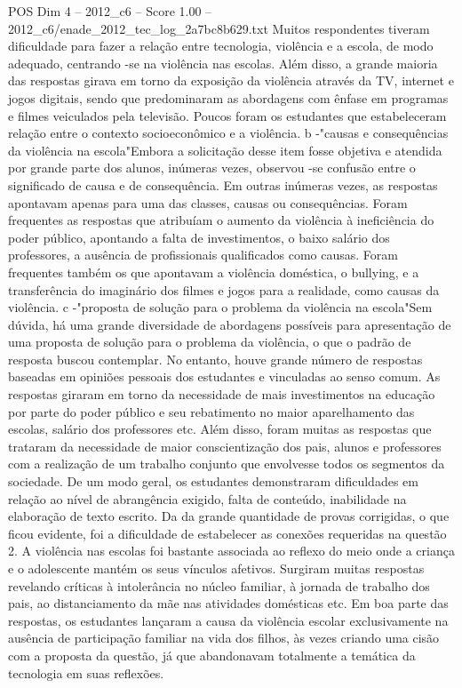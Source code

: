 \begin{textsample}{POS Dim 4 – 2012\_c6 – Score 1.00 – 2012\_c6/enade\_2012\_tec\_log\_2a7bc8b629.txt}
Muitos respondentes tiveram dificuldade para fazer a relação entre tecnologia, violência e a escola, de modo adequado, centrando -se na violência nas escolas.
Além disso, a grande maioria das respostas girava em torno da exposição da violência através da TV, internet e jogos digitais, sendo que predominaram as abordagens com ênfase em programas e filmes veiculados pela televisão.
Poucos foram os estudantes que estabeleceram relação entre o contexto socioeconômico e a violência. b -"causas e consequências da violência na escola"Embora a solicitação desse item fosse objetiva e atendida por grande parte dos alunos, inúmeras vezes, observou -se confusão entre o significado de causa e de consequência.
Em outras inúmeras vezes, as respostas apontavam apenas para uma das classes, causas ou consequências.
Foram frequentes as respostas que atribuíam o aumento da violência à ineficiência do poder público, apontando a falta de investimentos, o baixo salário dos professores, a ausência de profissionais qualificados como causas.
Foram frequentes também os que apontavam a violência doméstica, o bullying, e a transferência do imaginário dos filmes e jogos para a realidade, como causas da violência. c -"proposta de solução para o problema da violência na escola"Sem dúvida, há uma grande diversidade de abordagens possíveis para apresentação de uma proposta de solução para o problema da violência, o que o padrão de resposta buscou contemplar.
No entanto, houve grande número de respostas baseadas em opiniões pessoais dos estudantes e vinculadas ao senso comum.
As respostas giraram em torno da necessidade de mais investimentos na educação por parte do poder público e seu rebatimento no maior aparelhamento das escolas, salário dos professores etc.
Além disso, foram muitas as respostas que trataram da necessidade de maior conscientização dos pais, alunos e professores com a realização de um trabalho conjunto que envolvesse todos os segmentos da sociedade.
De um modo geral, os estudantes demonstraram dificuldades em relação ao nível de abrangência exigido, falta de conteúdo, inabilidade na elaboração de texto escrito.
Da da grande quantidade de provas corrigidas, o que ficou evidente, foi a dificuldade de estabelecer as conexões requeridas na questão 2.
A violência nas escolas foi bastante associada ao reflexo do meio onde a criança e o adolescente mantém os seus vínculos afetivos.
Surgiram muitas respostas revelando críticas à intolerância no núcleo familiar, à jornada de trabalho dos pais, ao distanciamento da mãe nas atividades domésticas etc.
Em boa parte das respostas, os estudantes lançaram a causa da violência escolar exclusivamente na ausência de participação familiar na vida dos filhos, às vezes criando uma cisão com a proposta da questão, já que abandonavam totalmente a temática da tecnologia em suas reflexões.

\end{textsample}
